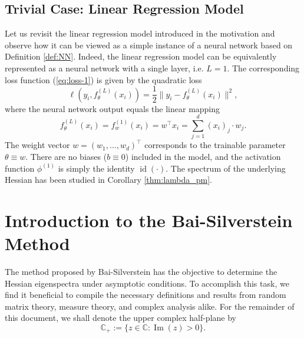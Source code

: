 \documentclass{article}
\begin{document}
\subsection{Trivial Case: Linear Regression Model}
Let us revisit the linear regression model introduced in the motivation and observe how it can be viewed as a simple instance of a neural network based on Definition \ref{def:NN}. Indeed, the linear regression model can be equivalently represented as a neural network with a single layer, i.e. $L=1$. The corresponding loss function (\ref{eq:loss-1}) is given by the quadratic loss
\begin{equation}
\ell(y_i,f_\theta^{(L)}(x_i))=\frac{1}{2}\|y_i-f_\theta^{(L)}(x_i)\|^2,
\end{equation}
where the neural network output equals the linear mapping
\begin{equation}
f_\theta^{(L)}(x_i) = f_w^{(1)}(x_i)=w^\top x_i=\sum_{j=1}^d(x_i)_j\cdot w_j.
\end{equation}
The weight vector $w=(w_1,\dots,w_d)^\top$ corresponds to the trainable parameter $\theta\equiv w$. There are no biases ($b\equiv0$) included in the model, and the activation function $\phi^{(1)}$ is simply the identity $\operatorname{id}(\cdot)$. The spectrum of the underlying Hessian has been studied in Corollary \ref{thm:lambda_pm}.


\begin{figure}[!htb]
\centering
{}
\label{fig:NLM}
\end{figure}

\newpage
\section{Introduction to the Bai-Silverstein Method}
The method proposed by Bai-Silverstein has the objective to determine the Hessian eigenspectra under asymptotic conditions. To accomplish this task, we find it beneficial to compile the necessary definitions and results from random matrix theory, measure theory, and complex analysis alike. For the remainder of this document, we shall denote the upper complex half-plane by 
\begin{equation}\mathbb{C}_+:=\{z\in\mathbb{C}:\operatorname{Im}(z)>0\}.
\end{equation}
\end{document}
